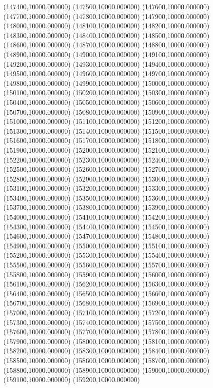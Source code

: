 (147400,10000.000000)
(147500,10000.000000)
(147600,10000.000000)
(147700,10000.000000)
(147800,10000.000000)
(147900,10000.000000)
(148000,10000.000000)
(148100,10000.000000)
(148200,10000.000000)
(148300,10000.000000)
(148400,10000.000000)
(148500,10000.000000)
(148600,10000.000000)
(148700,10000.000000)
(148800,10000.000000)
(148900,10000.000000)
(149000,10000.000000)
(149100,10000.000000)
(149200,10000.000000)
(149300,10000.000000)
(149400,10000.000000)
(149500,10000.000000)
(149600,10000.000000)
(149700,10000.000000)
(149800,10000.000000)
(149900,10000.000000)
(150000,10000.000000)
(150100,10000.000000)
(150200,10000.000000)
(150300,10000.000000)
(150400,10000.000000)
(150500,10000.000000)
(150600,10000.000000)
(150700,10000.000000)
(150800,10000.000000)
(150900,10000.000000)
(151000,10000.000000)
(151100,10000.000000)
(151200,10000.000000)
(151300,10000.000000)
(151400,10000.000000)
(151500,10000.000000)
(151600,10000.000000)
(151700,10000.000000)
(151800,10000.000000)
(151900,10000.000000)
(152000,10000.000000)
(152100,10000.000000)
(152200,10000.000000)
(152300,10000.000000)
(152400,10000.000000)
(152500,10000.000000)
(152600,10000.000000)
(152700,10000.000000)
(152800,10000.000000)
(152900,10000.000000)
(153000,10000.000000)
(153100,10000.000000)
(153200,10000.000000)
(153300,10000.000000)
(153400,10000.000000)
(153500,10000.000000)
(153600,10000.000000)
(153700,10000.000000)
(153800,10000.000000)
(153900,10000.000000)
(154000,10000.000000)
(154100,10000.000000)
(154200,10000.000000)
(154300,10000.000000)
(154400,10000.000000)
(154500,10000.000000)
(154600,10000.000000)
(154700,10000.000000)
(154800,10000.000000)
(154900,10000.000000)
(155000,10000.000000)
(155100,10000.000000)
(155200,10000.000000)
(155300,10000.000000)
(155400,10000.000000)
(155500,10000.000000)
(155600,10000.000000)
(155700,10000.000000)
(155800,10000.000000)
(155900,10000.000000)
(156000,10000.000000)
(156100,10000.000000)
(156200,10000.000000)
(156300,10000.000000)
(156400,10000.000000)
(156500,10000.000000)
(156600,10000.000000)
(156700,10000.000000)
(156800,10000.000000)
(156900,10000.000000)
(157000,10000.000000)
(157100,10000.000000)
(157200,10000.000000)
(157300,10000.000000)
(157400,10000.000000)
(157500,10000.000000)
(157600,10000.000000)
(157700,10000.000000)
(157800,10000.000000)
(157900,10000.000000)
(158000,10000.000000)
(158100,10000.000000)
(158200,10000.000000)
(158300,10000.000000)
(158400,10000.000000)
(158500,10000.000000)
(158600,10000.000000)
(158700,10000.000000)
(158800,10000.000000)
(158900,10000.000000)
(159000,10000.000000)
(159100,10000.000000)
(159200,10000.000000)
